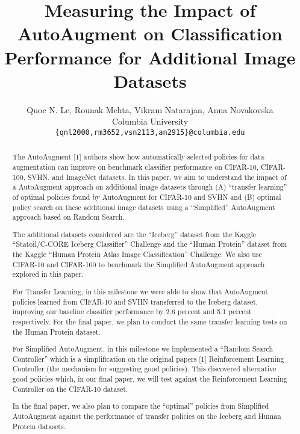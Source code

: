 \documentclass[10pt,twocolumn,letterpaper]{article}
\begin{document}
\title{Measuring the Impact of AutoAugment on Classification Performance for Additional Image Datasets}

\author{Quoc N. Le, Rounak Mehta, Vikram Natarajan, Anna Novakovska\\
Columbia University\\
{\tt\small \{qnl2000,rm3652,vsn2113,an2915\}@columbia.edu}
\\
}

\maketitle

\begin{abstract}
The AutoAugment [1] authors show how automatically-selected policies for data augmentation can improve on benchmark classifier performance on CIFAR-10, CIFAR-100, SVHN, and ImageNet datasets.  In this paper, we aim to understand the impact of a AutoAugment approach on additional image datasets through (A) “transfer learning” of optimal policies found by AutoAugment for CIFAR-10 and SVHN and (B) optimal policy search on these additional image datasets using a “Simplified” AutoAugment approach based on Random Search.  

The additional datasets considered are the “Iceberg” dataset from the Kaggle “Statoil/C-CORE Iceberg Classifier” Challenge and the “Human Protein” dataset from the Kaggle “Human Protein Atlas Image Classification” Challenge. We also use CIFAR-10 and CIFAR-100 to benchmark the Simplified AutoAugment approach explored in this paper.

For Transfer Learning, in this milestone we were able to show that AutoAugment policies learned from CIFAR-10 and SVHN transferred to the Iceberg dataset, improving our baseline classifier performance by 2.6 percent and 5.1 percent respectively.  For the final paper, we plan to conduct the same transfer learning tests on the Human Protein dataset.  

For Simplified AutoAugment, in this milestone we implemented a “Random Search Controller” which is a simplification on the original papers  [1] Reinforcement Learning Controller (the mechanism for suggesting good policies).  This discovered alternative good policies which, in our final paper, we will test against the Reinforcement Learning Controller on the CIFAR-10 dataset.

In the final paper, we also plan to compare the “optimal” policies from Simplified AutoAugment against the performance of transfer policies on the Iceberg and Human Protein datasets.


\end{abstract}
\end{document}
